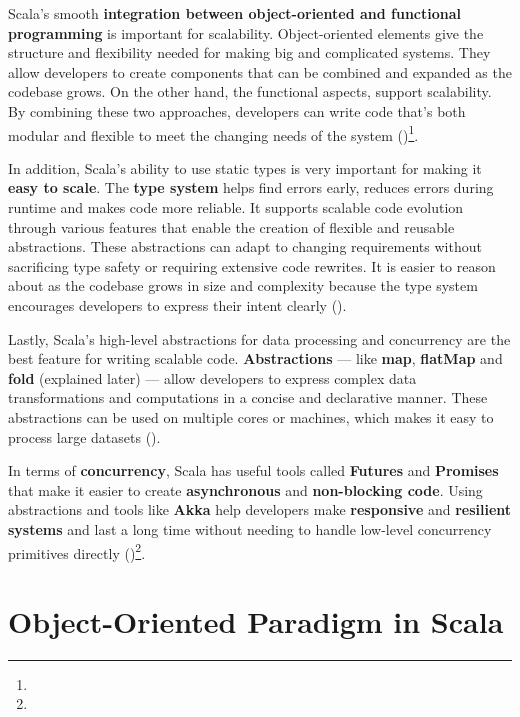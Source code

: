 Scala's smooth \textbf{integration between object-oriented and functional programming} is important for scalability. Object-oriented elements give the structure and flexibility needed for making big and complicated systems. They allow developers to create components that can be combined and expanded as the codebase grows. On the other hand, the functional aspects, support scalability. By combining these two approaches, developers can write code that's both modular and flexible to meet the changing needs of the system (\cite{odersky.etal_2021})\footnote[2]{}.

In addition, Scala's ability to use static types is very important for making it \textbf{easy to scale}. The \textbf{type system} helps find errors early, reduces errors during runtime and makes code more reliable. It supports scalable code evolution through various features that enable the creation of flexible and reusable abstractions. These abstractions can adapt to changing requirements without sacrificing type safety or requiring extensive code rewrites. It is easier to reason about as the codebase grows in size and complexity because the type system encourages developers to express their intent clearly (\cite{odersky.etal_2021})\footnotemark[2].

Lastly, Scala's high-level abstractions for data processing and concurrency are the best feature for writing scalable code. \textbf{Abstractions} — like \textbf{map}, \textbf{flatMap} and \textbf{fold} (explained later) — allow developers to express complex data transformations and computations in a concise and declarative manner. These abstractions can be used on multiple cores or machines, which makes it easy to process large datasets (\cite{odersky.etal_2021})\footnotemark[2].

In terms of \textbf{concurrency}, Scala has useful tools called \textbf{Futures} and \textbf{Promises} that make it easier to create \textbf{asynchronous} and \textbf{non-blocking code}. Using abstractions and tools like \textbf{Akka} help developers make \textbf{responsive} and \textbf{resilient systems} and last a long time without needing to handle low-level concurrency primitives directly (\cite{odersky.etal_2021})\footnote[2]{}.

\section{Object-Oriented Paradigm in Scala}

